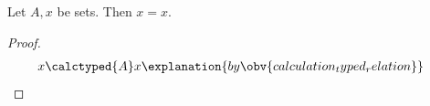 

\begin{proposition}\label{calculation_formation_failure}
    Let $A,x$ be sets.
    Then $x=x$.
\end{proposition}
\begin{proof}
    \begin{align*} x &\calctyped{A}x \explanation{by \obv{calculation_typed_relation}} \end{align*}
\end{proof}
